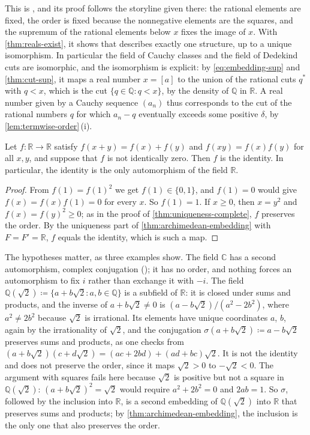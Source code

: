 This is , and its proof follows the storyline given there: the rational elements are fixed, the order is fixed because the nonnegative elements are the squares, and the supremum of the rational elements below $x$ fixes the image of $x$. With \cref{thm:reals-exist}, it shows that  describes exactly one structure, up to a unique isomorphism. In particular the field of Cauchy classes and the field of Dedekind cuts are isomorphic, and the isomorphism is explicit: by \eqref{eq:embedding-sup} and \cref{thm:cut-sup}, it maps a real number $x=[a]$ to the union of the rational cuts $q^*$ with $q<x$, which is the cut $\{q\in\mathbb Q: q<x\}$, by the density of $\mathbb Q$ in $\mathbb R$. A real number given by a Cauchy sequence $(a_n)$ thus corresponds to the cut of the rational numbers $q$ for which $a_n-q$ eventually exceeds some positive $\delta$, by \cref{lem:termwise-order}\,(i).

\begin{corollary}
\label{cor:r-automorphism}
Let $f\colon\mathbb R\to\mathbb R$ satisfy $f(x+y)=f(x)+f(y)$ and $f(xy)=f(x)f(y)$ for all $x,y$, and suppose that $f$ is not identically zero. Then $f$ is the identity. In particular, the identity is the only automorphism of the field $\mathbb R$.
\end{corollary}

\begin{proof}
From $f(1)=f(1)^2$ we get $f(1)\in\{0,1\}$, and $f(1)=0$ would give $f(x)=f(x)f(1)=0$ for every $x$. So $f(1)=1$. If $x\ge0$, then $x=y^2$ and $f(x)=f(y)^2\ge0$; as in the proof of \cref{thm:uniqueness-complete}, $f$ preserves the order. By the uniqueness part of \cref{thm:archimedean-embedding} with $F=F'=\mathbb R$, $f$ equals the identity, which is such a map.
\end{proof}

The hypotheses matter, as three examples show. The field $\mathbb C$ has a second automorphism, complex conjugation (); it has no order, and nothing forces an automorphism to fix $i$ rather than exchange it with $-i$. The field $\mathbb Q(\sqrt2)\coloneqq\{a+b\sqrt2: a,b\in\mathbb Q\}$ is a subfield of $\mathbb R$: it is closed under sums and products, and the inverse of $a+b\sqrt2\ne0$ is $(a-b\sqrt2)/(a^2-2b^2)$, where $a^2\ne2b^2$ because $\sqrt2$ is irrational. Its elements have unique coordinates $a$, $b$, again by the irrationality of $\sqrt2$, and the conjugation $\sigma(a+b\sqrt2)\coloneqq a-b\sqrt2$ preserves sums and products, as one checks from $(a+b\sqrt2)(c+d\sqrt2)=(ac+2bd)+(ad+bc)\sqrt2$. It is not the identity and does not preserve the order, since it maps $\sqrt2>0$ to $-\sqrt2<0$. The argument with squares fails here because $\sqrt2$ is positive but not a square in $\mathbb Q(\sqrt2)$: $(a+b\sqrt2)^2=\sqrt2$ would require $a^2+2b^2=0$ and $2ab=1$. So $\sigma$, followed by the inclusion into $\mathbb R$, is a second embedding of $\mathbb Q(\sqrt2)$ into $\mathbb R$ that preserves sums and products; by \cref{thm:archimedean-embedding}, the inclusion is the only one that also preserves the order.


